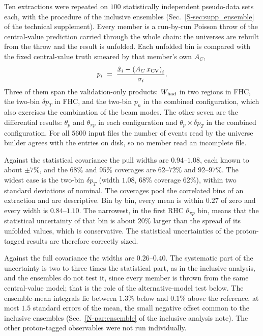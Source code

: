 \documentclass[11pt,a4paper]{article}
\newcommand{\suppref}[2]{#1~\ref{S-#2} of the technical supplement}
\newcommand{\noteref}[2]{#1~\ref{N-#2} of the inclusive analysis note}
\begin{document}
Ten extractions were repeated on $100$ statistically independent pseudo-data sets each, with the
procedure of the inclusive ensembles (\suppref{Sec.}{sec:supp_ensemble}). Every member is a run-by-run
Poisson throw of the central-value prediction carried through the whole chain: the universes are
rebuilt from the throw and the result is unfolded. Each unfolded bin is compared with the fixed
central-value truth smeared by that member's own $A_C$,
\[
  p_i \;=\; \frac{\hat{x}_i - \left(A_C\,x_{\rm CV}\right)_i}{\sigma_i}.
\]
Three of them span the validation-only products: $W_{\rm had}$ in two regions in FHC, the two-bin
$\delta p_T$ in FHC, and the two-bin $p_n$ in the combined configuration, which also exercises the
combination of the beam modes. The other seven are the differential  results:
$\theta_p$ and $\theta_{\pi p}$ in each configuration and $\theta_p\times\delta p_T$ in the combined
configuration. For all $5600$ input files the number of events read by the universe builder agrees
with the entries on disk, so no member read an incomplete file.



Against the statistical covariance the pull widths are $0.94$--$1.08$, each known to about $\pm7\%$,
and the $68\%$ and $95\%$ coverages are $62$--$72\%$ and $92$--$97\%$. The widest case is the two-bin
$\delta p_T$ (width $1.08$, $68\%$ coverage $62\%$), within two standard deviations of nominal. The
coverages pool the correlated bins of an extraction and are descriptive. Bin by bin, every mean
is within $0.27$ of zero and every width is $0.84$--$1.10$. The narrowest, in the first RHC
$\theta_{\pi p}$ bin, means that the statistical uncertainty of that bin is about $20\%$ larger than the
spread of its unfolded values, which is conservative. The statistical uncertainties of the
proton-tagged results are therefore correctly sized.

Against the full covariance the widths are $0.26$--$0.40$. The systematic part of the uncertainty is
two to three times the statistical part, as in the inclusive analysis, and the ensembles do not test
it, since every member is thrown from the same central-value model; that is the role of the
alternative-model test below. The ensemble-mean integrals lie between $1.3\%$ below and $0.1\%$ above
the reference, at most $1.5$ standard errors of the mean, the small negative offset common to the
inclusive ensembles (\noteref{Sec.}{par:ensemble}). The other proton-tagged observables were not run
individually.
\end{document}
